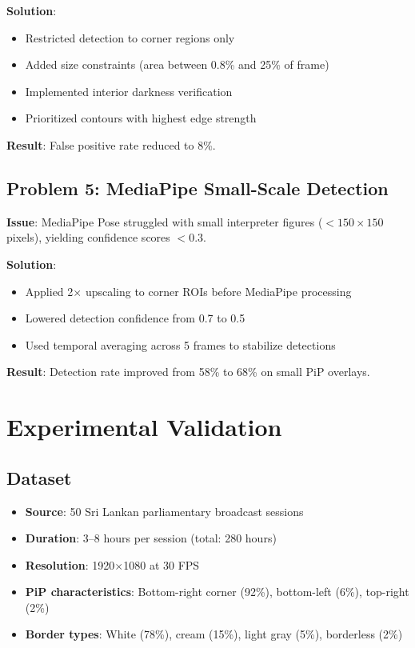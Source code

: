 \documentclass[11pt,a4paper]{article}
\begin{document}
\textbf{Solution}:
\begin{itemize}
    \item Restricted detection to corner regions only
    \item Added size constraints (area between 0.8\% and 25\% of frame)
    \item Implemented interior darkness verification
    \item Prioritized contours with highest edge strength
\end{itemize}

\textbf{Result}: False positive rate reduced to 8\%.

\subsection{Problem 5: MediaPipe Small-Scale Detection}

\textbf{Issue}: MediaPipe Pose struggled with small interpreter figures ($<150 \times 150$ pixels), yielding confidence scores $<0.3$.

\textbf{Solution}:
\begin{itemize}
    \item Applied 2$\times$ upscaling to corner ROIs before MediaPipe processing
    \item Lowered detection confidence from 0.7 to 0.5
    \item Used temporal averaging across 5 frames to stabilize detections
\end{itemize}

\textbf{Result}: Detection rate improved from 58\% to 68\% on small PiP overlays.

\section{Experimental Validation}

\subsection{Dataset}

\begin{itemize}
    \item \textbf{Source}: 50 Sri Lankan parliamentary broadcast sessions
    \item \textbf{Duration}: 3--8 hours per session (total: 280 hours)
    \item \textbf{Resolution}: 1920$\times$1080 at 30 FPS
    \item \textbf{PiP characteristics}: Bottom-right corner (92\%), bottom-left (6\%), top-right (2\%)
    \item \textbf{Border types}: White (78\%), cream (15\%), light gray (5\%), borderless (2\%)
\end{itemize}
\end{document}

